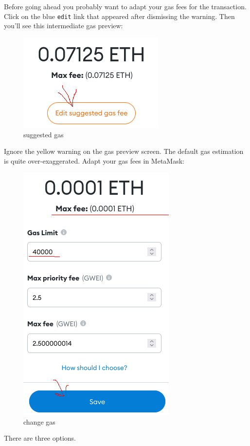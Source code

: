 \documentclass[
]{article}
\begin{document}
Before going ahead you probably want to adapt your gas fees for the
transaction. Click on the blue \texttt{edit} link that appeared after
dismissing the warning. Then you'll see this intermediate gas preview:

\begin{figure}
\centering
\includegraphics{images/suggested_gas.png}
\caption{suggested gas}
\end{figure}\newpage

Ignore the yellow warning on the gas preview screen. The default gas
estimation is quite over-exaggerated. Adapt your gas fees in MetaMask:

\begin{figure}
\centering
\includegraphics{images/edit_gas.png}
\caption{change gas}
\end{figure}\newpage

There are three options.
\end{document}

